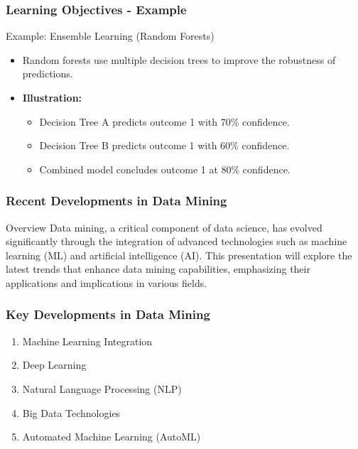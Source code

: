 \documentclass{beamer}
\begin{document}
\begin{frame}[fragile]
    \frametitle{Learning Objectives - Example}
    \begin{block}{Example: Ensemble Learning (Random Forests)}
        \begin{itemize}
            \item Random forests use multiple decision trees to improve the robustness of predictions.
            \item \textbf{Illustration:}
                \begin{itemize}
                    \item Decision Tree A predicts outcome 1 with 70\% confidence.
                    \item Decision Tree B predicts outcome 1 with 60\% confidence.
                    \item Combined model concludes outcome 1 at 80\% confidence.
                \end{itemize}
        \end{itemize}
    \end{block}
\end{frame}

\begin{frame}[fragile]
    \frametitle{Recent Developments in Data Mining}
    \begin{block}{Overview}
        Data mining, a critical component of data science, has evolved significantly through the integration of advanced technologies such as machine learning (ML) and artificial intelligence (AI). This presentation will explore the latest trends that enhance data mining capabilities, emphasizing their applications and implications in various fields.
    \end{block}
\end{frame}

\begin{frame}[fragile]
    \frametitle{Key Developments in Data Mining}
    \begin{enumerate}
        \item Machine Learning Integration
        \item Deep Learning
        \item Natural Language Processing (NLP)
        \item Big Data Technologies
        \item Automated Machine Learning (AutoML)
    \end{enumerate}
\end{frame}
\end{document}
